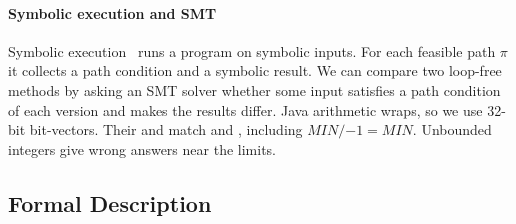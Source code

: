 \paragraph{Symbolic execution and SMT}
Symbolic execution~\citep{king1976symbolic} runs a program on symbolic inputs. For each
feasible path $\pi$ it collects a path condition and a symbolic result. We can compare two
loop-free methods by asking an SMT solver whether some input satisfies a path condition of
each version and makes the results differ. Java  arithmetic wraps, so we use 32-bit
bit-vectors. Their  and  match  and ,
including $\mathit{MIN} / {-1} = \mathit{MIN}$. Unbounded integers give wrong answers near the
limits.

\subsection{Formal Description}
\label{sec:formal}

